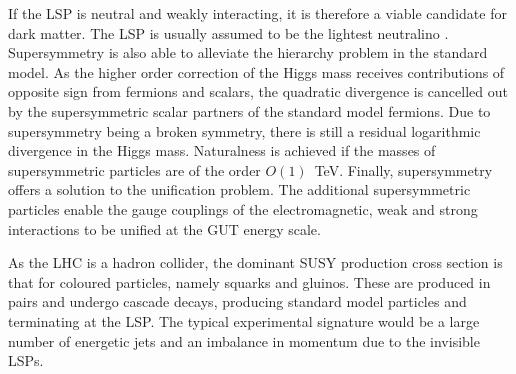 If the LSP is neutral and weakly interacting, 
it is therefore a viable candidate for dark matter. The LSP is usually assumed 
to be the lightest neutralino \neutralino. 
Supersymmetry is also able to alleviate the hierarchy problem in the standard 
model. As the higher order correction of the Higgs mass receives contributions 
of opposite sign from fermions and scalars, the quadratic divergence is 
cancelled out by 
the supersymmetric scalar partners of the standard model fermions. Due to 
supersymmetry being a broken symmetry, there is still a residual logarithmic 
divergence in the Higgs mass. Naturalness is achieved if the masses of 
supersymmetric particles are of the order $O(1)$~TeV. 
Finally, supersymmetry offers a solution to the unification problem. The 
additional supersymmetric particles enable the gauge couplings of the 
electromagnetic, weak and strong interactions to be unified at the GUT energy 
scale.

As the LHC is a hadron collider, the dominant SUSY production cross section is 
that for coloured particles, namely squarks and gluinos. These are produced in 
pairs and undergo cascade decays, producing standard model particles and 
terminating at the LSP. The typical experimental signature would be a large 
number of energetic jets and an imbalance in momentum due to the invisible LSPs.




